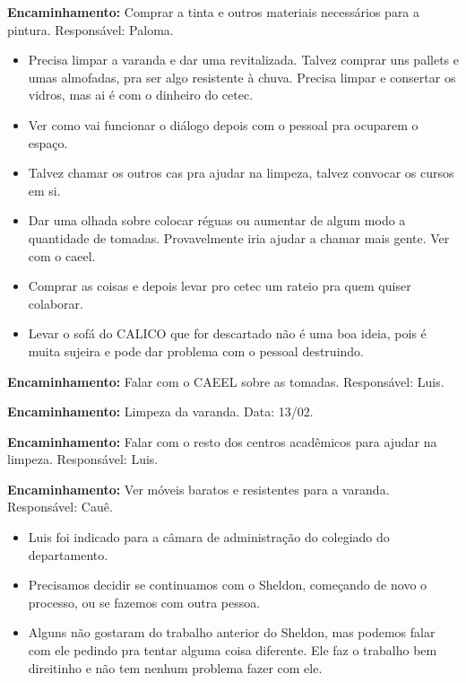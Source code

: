 \documentclass{ata-calico}
\begin{document}
\textbf{Encaminhamento:} Comprar a tinta e outros materiais necessários para a pintura. Responsável: Paloma.

\begin{itemize}
\item Precisa limpar a varanda e dar uma revitalizada. Talvez comprar uns pallets e umas almofadas, pra ser algo resistente à chuva. Precisa limpar e consertar os vidros, mas ai é com o dinheiro do cetec.
\item Ver como vai funcionar o diálogo depois com o pessoal pra ocuparem o espaço.
\item Talvez chamar os outros cas pra ajudar na limpeza, talvez convocar os cursos em si.
\item Dar uma olhada sobre colocar réguas ou aumentar de algum modo a quantidade de tomadas. Provavelmente iria ajudar a chamar mais gente. Ver com o caeel.
\item Comprar as coisas e depois levar pro cetec um rateio pra quem quiser colaborar.
\item Levar o sofá do CALICO que for descartado não é uma boa ideia, pois é muita sujeira e pode dar problema com o pessoal destruindo.
\end{itemize}

\textbf{Encaminhamento:} Falar com o CAEEL sobre as tomadas. Responsável: Luis.

\textbf{Encaminhamento:} Limpeza da varanda. Data: 13/02.

\textbf{Encaminhamento:} Falar com o resto dos centros acadêmicos para ajudar na limpeza. Responsável: Luis.

\textbf{Encaminhamento:} Ver móveis baratos e resistentes para a varanda. Responsável: Cauê.

\begin{itemize}
    \item Luis foi indicado para a câmara de administração do colegiado do departamento.
\end{itemize}

\begin{itemize}
\item Precisamos decidir se continuamos com o Sheldon, começando de novo o processo, ou se fazemos com outra pessoa.
\item Alguns não gostaram do trabalho anterior do Sheldon, mas podemos falar com ele pedindo pra tentar alguma coisa diferente. Ele faz o trabalho bem direitinho e não tem nenhum problema fazer com ele.
\end{itemize}
\end{document}
